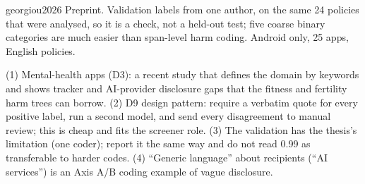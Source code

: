 \begin{papercard}{georgiou2026}
 Preprint. Validation labels from one author, on the same 24 policies that were analysed, so it is a check, not a held-out test; five coarse binary categories are much easier than span-level harm coding. Android only, 25 apps, English policies.

 (1) Mental-health apps (D3): a recent study that defines the domain by keywords and shows tracker and AI-provider disclosure gaps that the fitness and fertility harm trees can borrow. (2) D9 design pattern: require a verbatim quote for every positive label, run a second model, and send every disagreement to manual review; this is cheap and fits the screener role. (3) The validation has the thesis's limitation (one coder); report it the same way and do not read 0.99 as transferable to harder codes. (4) ``Generic language'' about recipients (``AI services'') is an Axis A/B coding example of vague disclosure.
\end{papercard}
